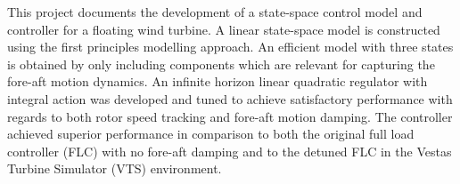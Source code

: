 \abstract
\noindent This project documents the development of a state-space control model and controller for a floating wind turbine. A linear state-space model is constructed using the first principles modelling approach. An efficient model with three states is obtained by only including components which are relevant for capturing the fore-aft motion dynamics. An infinite horizon linear quadratic regulator with integral action was developed and tuned to achieve satisfactory performance with regards to both rotor speed tracking and fore-aft motion damping. The controller achieved superior performance in comparison to both the original full load controller (FLC) with no fore-aft damping and to the detuned FLC in the Vestas Turbine Simulator (VTS) environment. 